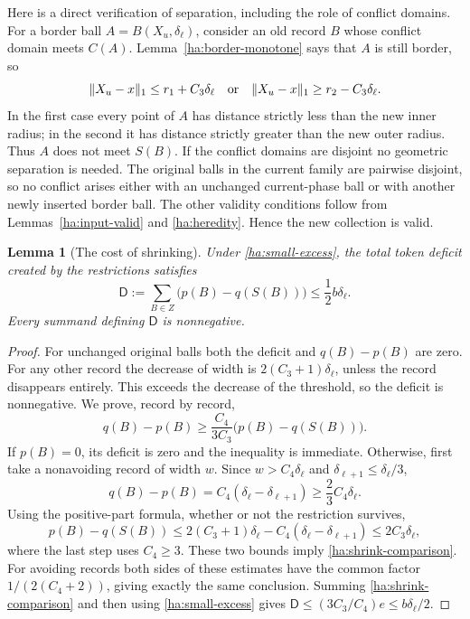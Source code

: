 \documentclass[11pt]{amsart}
\newtheorem{lemma}[theorem]{Lemma}
\theoremstyle{definition}
\theoremstyle{remark}
\numberwithin{equation}{section}
\begin{document}
Here is a direct verification of separation, including the role
of conflict domains.  For a border ball $A=B(X_u,\delta_\ell)$,
consider an old record $B$ whose conflict domain meets $C(A)$.
Lemma~\ref{ha:border-monotone} says that $A$ is still border, so
\[
 \|X_u-x\|_1\le r_1+C_3\delta_\ell
 \quad\hbox{or}\quad
 \|X_u-x\|_1\ge r_2-C_3\delta_\ell.
\]
In the first case every point of $A$ has distance strictly less
than the new inner radius; in the second it has distance strictly
greater than the new outer radius.  Thus $A$ does not meet $S(B)$.
If the conflict domains are disjoint no geometric separation is needed.
The original balls in the current family are pairwise disjoint,
so no conflict arises either with an unchanged current-phase ball
or with another newly inserted border ball.  The other validity
conditions follow from Lemmas~\ref{ha:input-valid} and
\ref{ha:heredity}.  Hence the new collection is valid.

\begin{lemma}[The cost of shrinking]\label{ha:shrink-cost}
Under \eqref{ha:small-excess}, the total token deficit created by
the restrictions satisfies
\[
 \mathsf D:=\sum_{B\in Z}\bigl(p(B)-q(S(B))\bigr)
 \le\frac12 b\delta_\ell.
\]
Every summand defining $\mathsf D$ is nonnegative.
\end{lemma}
\begin{proof}
For unchanged original balls both the deficit and $q(B)-p(B)$
are zero.  For any other record the decrease of width is
$2(C_3+1)\delta_\ell$, unless the record disappears entirely.
This exceeds the decrease of the threshold, so the deficit is
nonnegative.  We prove, record by record,
\begin{equation}\label{ha:shrink-comparison}
 q(B)-p(B)\ge\frac{C_4}{3C_3}
                   \bigl(p(B)-q(S(B))\bigr).
\end{equation}
If $p(B)=0$, its deficit is zero and the inequality is immediate.
Otherwise, first take a nonavoiding record of width $w$.
Since $w>C_4\delta_\ell$ and
$\delta_{\ell+1}\le\delta_\ell/3$,
\[
 q(B)-p(B)=C_4(\delta_\ell-\delta_{\ell+1})
             \ge\frac23 C_4\delta_\ell.
\]
Using the positive-part formula, whether or not the restriction
survives,
\[
 p(B)-q(S(B))
 \le2(C_3+1)\delta_\ell-C_4(\delta_\ell-\delta_{\ell+1})
 \le2C_3\delta_\ell,
\]
where the last step uses $C_4\ge3$.
These two bounds imply \eqref{ha:shrink-comparison}.
For avoiding records both sides of these estimates have the common
factor $1/(2(C_4+2))$, giving exactly the same conclusion.
Summing \eqref{ha:shrink-comparison} and then using
\eqref{ha:small-excess} gives
$\mathsf D\le(3C_3/C_4)e\le b\delta_\ell/2$.
\end{proof}
\end{document}
